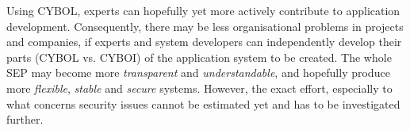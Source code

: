 Using CYBOL, experts can hopefully yet more actively contribute to application
development. Consequently, there may be less organisational problems in
projects and companies, if experts and system developers can independently
develop their parts (CYBOL vs. CYBOI) of the application system to be created.
The whole SEP may become more \emph{transparent} and \emph{understandable}, and
hopefully produce more \emph{flexible}, \emph{stable} and \emph{secure}
systems. However, the exact effort, especially to what concerns security issues
cannot be estimated yet and has to be investigated further.
